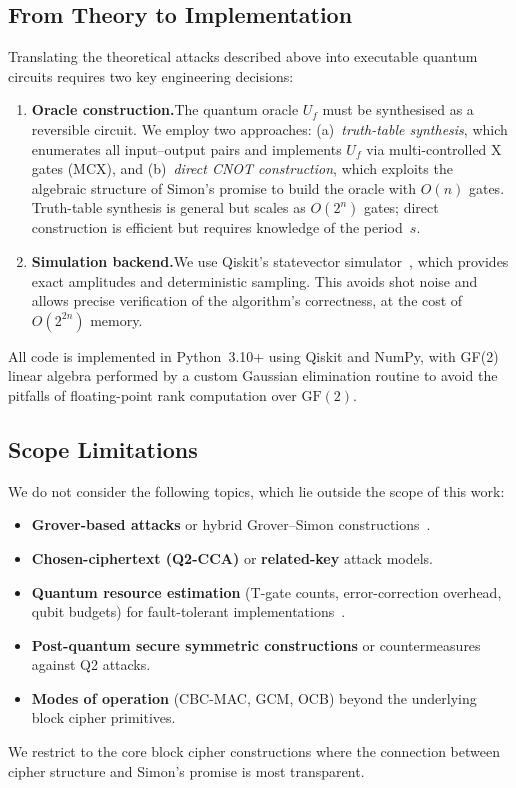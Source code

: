 \documentclass[11pt,a4paper]{article}
\begin{document}
\subsection{From Theory to Implementation}

Translating the theoretical attacks described above into executable
quantum circuits requires two key engineering decisions:

\begin{enumerate}
    \item \textbf{Oracle construction.}\quad The quantum oracle $U_f$
    must be synthesised as a reversible circuit.  We employ two
    approaches: (a)~\emph{truth-table synthesis}, which enumerates all
    input--output pairs and implements $U_f$ via multi-controlled X gates
    (MCX), and (b)~\emph{direct CNOT construction}, which exploits the
    algebraic structure of Simon's promise to build the oracle with
    $O(n)$ gates.  Truth-table synthesis is general but scales as
    $O(2^n)$ gates; direct construction is efficient but requires
    knowledge of the period~$s$.

    \item \textbf{Simulation backend.}\quad We use Qiskit's statevector
    simulator~\cite{Qiskit2024}, which provides exact amplitudes and
    deterministic sampling.  This avoids shot noise and allows
    precise verification of the algorithm's correctness, at the cost of
    $O(2^{2n})$ memory.
\end{enumerate}

All code is implemented in Python~3.10+ using Qiskit and NumPy, with
GF(2) linear algebra performed by a custom Gaussian elimination routine
to avoid the pitfalls of floating-point rank computation over
$\text{GF}(2)$.

\subsection{Scope Limitations}

We do not consider the following topics, which lie outside the scope of
this work:
\begin{itemize}
    \item \textbf{Grover-based attacks} or hybrid Grover--Simon
    constructions~\cite{Leander2017}.
    \item \textbf{Chosen-ciphertext (Q2-CCA)} or
    \textbf{related-key} attack models.
    \item \textbf{Quantum resource estimation} (T-gate counts,
    error-correction overhead, qubit budgets) for fault-tolerant
    implementations~\cite{Bonnetain2020}.
    \item \textbf{Post-quantum secure symmetric constructions} or
    countermeasures against Q2 attacks.
    \item \textbf{Modes of operation} (CBC-MAC, GCM, OCB) beyond
    the underlying block cipher primitives.
\end{itemize}
We restrict to the core block cipher constructions where the connection
between cipher structure and Simon's promise is most transparent.
\end{document}
